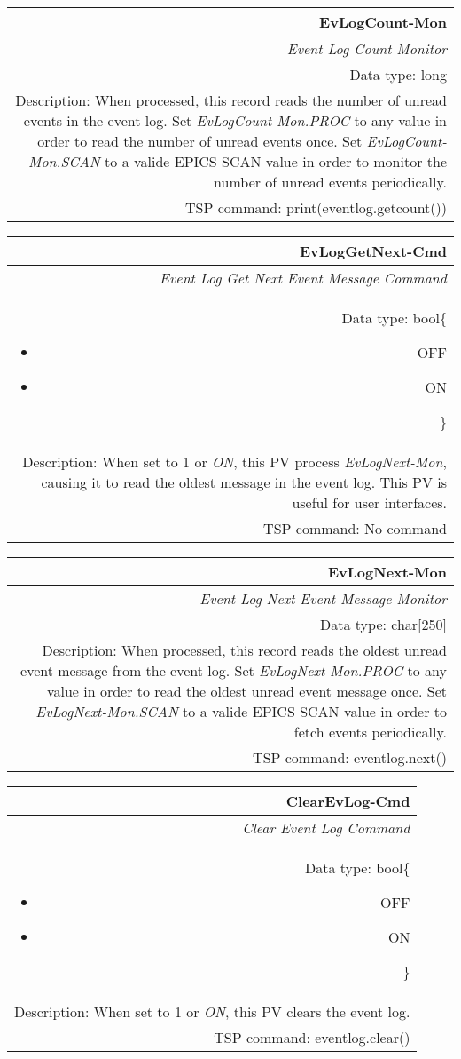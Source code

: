 \documentclass[openany]{article}
\begin{document}
		\begin{tabular}{N}
			\hline
			\bfseries EvLogCount-Mon\label{pv:evlogcount-mon} \\ \hline
			\emph{Event Log Count Monitor} \\
			Data type: long \\
			Description: When processed, this record reads the number of unread events in the event log. Set \emph{EvLogCount-Mon.PROC} to any value in order to read the number of unread events once. Set \emph{EvLogCount-Mon.SCAN} to a valide EPICS SCAN value in order to monitor the number of unread events periodically. \\
			TSP command: print(eventlog.getcount())
		\end{tabular}

		\begin{tabular}{N}
			\hline
			\bfseries EvLogGetNext-Cmd\label{pv:evloggetnext-mon} \\ \hline
			\emph{Event Log Get Next Event Message Command} \\
			Data type: bool\{\begin{itemize}[noitemsep]
				\small
				\item[] OFF
				\item[] ON
			\end{itemize}\} \\
			Description: When set to 1 or \emph{ON}, this PV process \emph{EvLogNext-Mon}, causing it to read the oldest message in the event log. This PV is useful for user interfaces. \\
			TSP command: No command
		\end{tabular}

		\begin{tabular}{N}
			\hline
			\bfseries EvLogNext-Mon\label{pv:evlognext-mon} \\ \hline
			\emph{Event Log Next Event Message Monitor} \\
			Data type: char[250] \\
			Description: When processed, this record reads the oldest unread event message from the event log. Set \emph{EvLogNext-Mon.PROC} to any value in order to read the oldest unread event message once. Set \emph{EvLogNext-Mon.SCAN} to a valide EPICS SCAN value in order to fetch events periodically. \\
			TSP command: eventlog.next()
		\end{tabular}

		\begin{tabular}{N}
			\hline
			\bfseries ClearEvLog-Cmd\label{pv:clearevlog-cmd} \\ \hline
			\emph{Clear Event Log Command} \\
			Data type: bool\{\begin{itemize}[noitemsep]
				\small
				\item[] OFF
				\item[] ON
			\end{itemize}\} \\
			Description: When set to 1 or \emph{ON}, this PV clears the event log. \\
			TSP command: eventlog.clear()
		\end{tabular}
\end{document}

